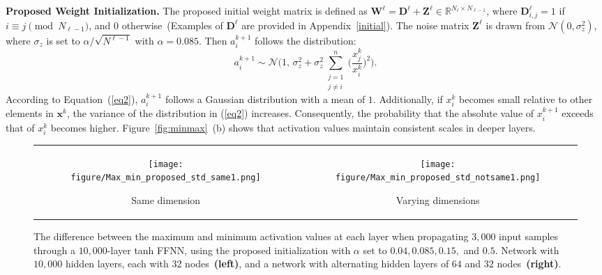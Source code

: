 \documentclass{article} \usepackage{iclr2025_conference,times}
\begin{document}
\textbf{Proposed Weight Initialization.} The proposed initial weight matrix is defined as $\mathbf{W}^{\ell} = \mathbf{D}^{\ell} + \mathbf{Z}^{\ell} \in \mathbb{R}^{N_{\ell} \times N_{\ell-1}}$, where $\mathbf{D}^{\ell}_{i,j} = 1$ if $i \equiv j \pmod{N_{\ell -1}}$, and 0 otherwise~(Examples of $\mathbf{D}^{\ell}$ are provided in Appendix~\ref{initial}). The noise matrix  $\mathbf{Z}^{\ell}$ is drawn from $\mathcal{N}(0,\sigma_z^2)$, 
where $\sigma_z$ is set to $\alpha/\sqrt{N^{\ell-1}}$ with $\alpha=0.085$. 
Then $a_i^{k+1}$ follows the distribution: 
\begin{equation}\label{eq2}
a_i^{k+1}\sim\mathcal{N} \Bigg( 1, \, \sigma_z^2 +\sigma_z^2\sum_{\substack{j=1 \\ j \neq i}}^n \bigg(\frac{x_j^{k}}{x_i^{k}} \bigg)^2 \Bigg).
\end{equation}
According to Equation~(\ref{eq2}), $a_i^{k+1}$ follows a Gaussian distribution with a mean of $1$. Additionally, if $x_i^k$ becomes small relative to other elements in $\bm{x}^k$, the variance of the distribution in (\ref{eq2}) increases. 
Consequently, the probability that the absolute value of $x_i^{k+1}$ exceeds that of $x_i^k$ becomes higher. 
Figure~\ref{fig:minmax}~(b) shows that activation values maintain consistent scales in deeper layers. 



\begin{figure}[t!]
\centering 
\begin{tabular}{cc}
\begin{subfigure}[b]{0.45\textwidth}
    \centering
    \texttt{[image: figure/Max\_min\_proposed\_std\_same1.png]}
    \caption{Same dimension}
\end{subfigure} &
\begin{subfigure}[b]{0.45\textwidth}
    \centering
    \texttt{[image: figure/Max\_min\_proposed\_std\_notsame1.png]}
    \caption{Varying dimensions}
\end{subfigure} 
\end{tabular}
\caption{The difference between the maximum and minimum activation values at each layer when propagating $3,000$ input samples through a $10,000$-layer tanh FFNN, using the proposed initialization with \(\alpha\) set to $0.04, 0.085, 0.15,$ and $0.5$. Network with $10,000$ hidden layers, each with 32 nodes~\textbf{(left)}, and a network with alternating hidden layers of $64$ and $32$ nodes~\textbf{(right)}.} 
\label{fig:minmax_std}
\end{figure}
\end{document}
